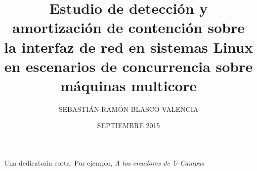 \documentclass[upright, contnum]{umemoria}
\author{SEBASTIÁN RAMÓN BLASCO VALENCIA}
\title{Estudio de detección y amortización de contención sobre la interfaz de red en sistemas Linux en escenarios de concurrencia sobre máquinas multicore}
\date{SEPTIEMBRE 2015}
\begin{document}
\frontmatter
\maketitle

\begin{abstract}
{\lipsum[1-4]}
\end{abstract}

\begin{dedicatoria} %
Una dedicatoria corta. Por ejemplo, \emph{A los creadores de U-Campus}
\end{dedicatoria}

\begin{thanks} %
\lipsum[1-2]
\end{thanks}
\cleardoublepage

\tableofcontents
\listoftables %
\listoffigures %

\mainmatter


%
%










\end{document}
